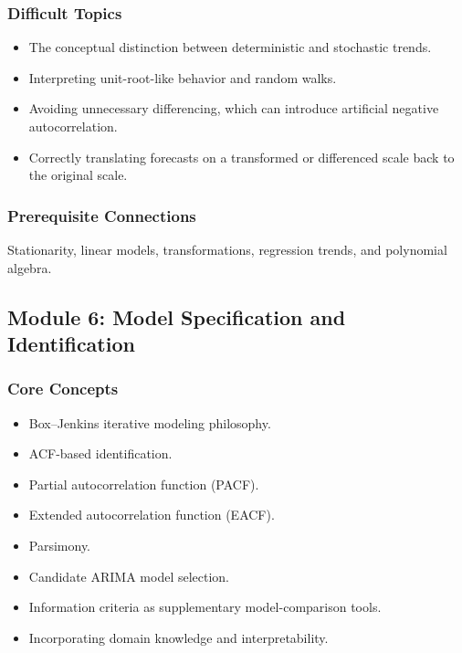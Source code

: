 \documentclass[11pt]{article}
\begin{document}
\subsubsection{Difficult Topics}

\begin{itemize}
    \item The conceptual distinction between deterministic and stochastic trends.
    \item Interpreting unit-root-like behavior and random walks.
    \item Avoiding unnecessary differencing, which can introduce artificial
    negative autocorrelation.
    \item Correctly translating forecasts on a transformed or differenced scale
    back to the original scale.
\end{itemize}

\subsubsection{Prerequisite Connections}

Stationarity, linear models, transformations, regression trends, and
polynomial algebra.

\subsection{Module 6: Model Specification and Identification}

\subsubsection{Core Concepts}

\begin{itemize}
    \item Box--Jenkins iterative modeling philosophy.
    \item ACF-based identification.
    \item Partial autocorrelation function (PACF).
    \item Extended autocorrelation function (EACF).
    \item Parsimony.
    \item Candidate ARIMA model selection.
    \item Information criteria as supplementary model-comparison tools.
    \item Incorporating domain knowledge and interpretability.
\end{itemize}
\end{document}
